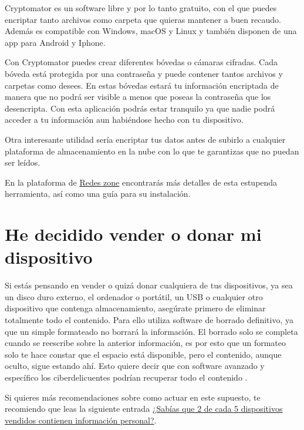 \documentclass[
  spanish,
  a4paper,
  openany]{book}
\begin{document}
Cryptomator es un software libre y por lo tanto gratuito, con el que puedes encriptar tanto archivos como carpeta que quieras mantener a buen recaudo. Además es compatible con Windows, macOS y Linux y también disponen de una app para Android y Iphone.

Con Cryptomator puedes crear diferentes bóvedas o cámaras cifradas. Cada bóveda está protegida por una contraseña y puede contener tantos archivos y carpetas como desees. En estas bóvedas estará tu información encriptada de manera que no podrá ser visible a menos que poseas la contraseña que los desencripta. Con esta aplicación podrás estar tranquilo ya que nadie podrá acceder a tu información aun habiéndose hecho con tu dispositivo.

Otra interesante utilidad sería encriptar tus datos antes de subirlo a cualquier plataforma de almacenamiento en la nube con lo que te garantizas que no puedan ser leídos.

En la plataforma de \href{https://www.redeszone.net/tutoriales/seguridad/cryptomator-encriptar-archivos-carpetas/}{Redes zone} encontrarás más detalles de esta estupenda herramienta, así como una guía para su instalación.

\hypertarget{he-decidido-vender-o-donar-mi-dispositivo}{%
\section{He decidido vender o donar mi dispositivo}\label{he-decidido-vender-o-donar-mi-dispositivo}}

Si estás pensando en vender o quizá donar cualquiera de tus dispositivos, ya sea un disco duro externo, el ordenador o portátil, un USB o cualquier otro dispositivo que contenga almacenamiento, asegúrate primero de eliminar totalmente todo el contenido. Para ello utiliza software de borrado definitivo, ya que un simple formateado no borrará la información. El borrado solo se completa cuando se reescribe sobre la anterior información, es por esto que un formateo solo te hace constar que el espacio está disponible, pero el contenido, aunque oculto, sigue estando ahí. Esto quiere decir que con software avanzado y específico los ciberdelicuentes podrían recuperar todo el contenido \citep{XATAKA-borrado-almacenamiento}.

Si quieres más recomendaciones sobre como actuar en este supuesto, te recomiendo que leas la siguiente entrada \href{https://www.osi.es/es/actualidad/blog/2019/10/09/sabias-que-2-de-cada-5-dispositivos-vendidos-contienen-informacion}{¿Sabías que 2 de cada 5 dispositivos vendidos contienen información personal?}.
\end{document}
